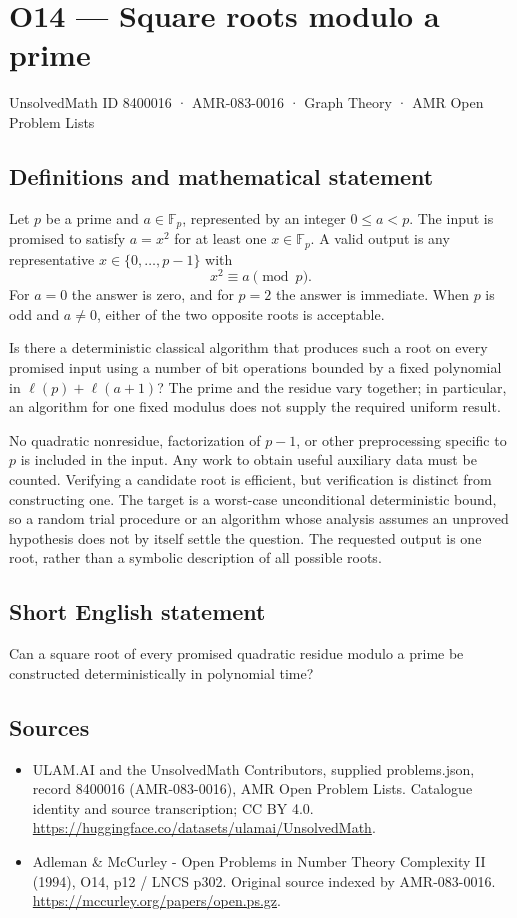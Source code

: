 \documentclass[11pt,a4paper]{article}
\begin{document}
\section*{O14 — Square roots modulo a prime}\label{8400016}
{\small UnsolvedMath ID 8400016 · AMR-083-0016 · Graph Theory · AMR Open Problem Lists}
\subsection{Definitions and mathematical statement}
Let $p$ be a prime and $a\in\mathbb F_p$, represented by an integer $0\le a<p$. The input is promised to satisfy $a=x^2$ for at least one $x\in\mathbb F_p$. A valid output is any representative $x\in\{0,\ldots,p-1\}$ with
\[
x^2\equiv a\pmod p.
\]
For $a=0$ the answer is zero, and for $p=2$ the answer is immediate. When $p$ is odd and $a\ne0$, either of the two opposite roots is acceptable.

Is there a deterministic classical algorithm that produces such a root on every promised input using a number of bit operations bounded by a fixed polynomial in $\ell(p)+\ell(a+1)$? The prime and the residue vary together; in particular, an algorithm for one fixed modulus does not supply the required uniform result.

No quadratic nonresidue, factorization of $p-1$, or other preprocessing specific to $p$ is included in the input. Any work to obtain useful auxiliary data must be counted. Verifying a candidate root is efficient, but verification is distinct from constructing one. The target is a worst-case unconditional deterministic bound, so a random trial procedure or an algorithm whose analysis assumes an unproved hypothesis does not by itself settle the question. The requested output is one root, rather than a symbolic description of all possible roots.
\subsection{Short English statement}
Can a square root of every promised quadratic residue modulo a prime be constructed deterministically in polynomial time?
\subsection{Sources}
\begin{itemize}
\item[S1] ULAM.AI and the UnsolvedMath Contributors, supplied problems.json, record 8400016 (AMR-083-0016), AMR Open Problem Lists. Catalogue identity and source transcription; CC BY 4.0.
\url{https://huggingface.co/datasets/ulamai/UnsolvedMath}.
\item[S2] Adleman \& McCurley - Open Problems in Number Theory Complexity II (1994), O14, p12 / LNCS p302. Original source indexed by AMR-083-0016.
\url{https://mccurley.org/papers/open.ps.gz}.
\end{itemize}
\end{document}
